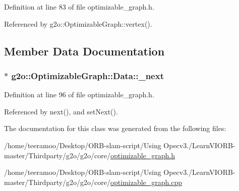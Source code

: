 Definition at line 83 of file optimizable\+\_\+graph.\+h.



Referenced by g2o\+::\+Optimizable\+Graph\+::vertex().



\subsection{Member Data Documentation}
\subsubsection[{\texorpdfstring{\+\_\+next}{_next}}]{$\ast$ g2o\+::\+Optimizable\+Graph\+::\+Data\+::\+\_\+next\hspace{0.3cm}{\ttfamily [protected]}}\hypertarget{classg2o_1_1OptimizableGraph_1_1Data_a8e0569f2b8cb8400d3eada1bd13c0ccb}{}\label{classg2o_1_1OptimizableGraph_1_1Data_a8e0569f2b8cb8400d3eada1bd13c0ccb}


Definition at line 96 of file optimizable\+\_\+graph.\+h.



Referenced by next(), and set\+Next().



The documentation for this class was generated from the following files\+:\begin{DoxyCompactItemize}
\item 
/home/teeramoo/\+Desktop/\+O\+R\+B-\/slam-\/script/\+Using Opecv3./\+Learn\+V\+I\+O\+R\+B-\/master/\+Thirdparty/g2o/g2o/core/\hyperlink{optimizable__graph_8h}{optimizable\+\_\+graph.\+h}\item 
/home/teeramoo/\+Desktop/\+O\+R\+B-\/slam-\/script/\+Using Opecv3./\+Learn\+V\+I\+O\+R\+B-\/master/\+Thirdparty/g2o/g2o/core/\hyperlink{optimizable__graph_8cpp}{optimizable\+\_\+graph.\+cpp}\end{DoxyCompactItemize}
